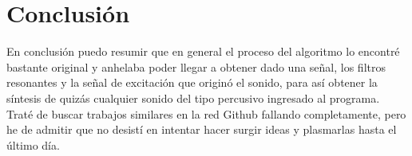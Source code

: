 \documentclass[11pt]{amsart}
\theoremstyle{plain}
\theoremstyle{definition}
\begin{document}
\section{Conclusión}
En conclusión puedo resumir que en general el proceso del algoritmo lo encontré bastante original y anhelaba poder llegar a obtener dado una señal, los filtros resonantes y la señal de excitación que originó el sonido, para así obtener la síntesis de quizás cualquier sonido del tipo percusivo ingresado al programa. Traté de buscar trabajos similares en la red Github fallando completamente, pero he de admitir que no desistí en intentar hacer surgir ideas y plasmarlas hasta el último día. 





\begin{footnotesize}


\end{footnotesize}
\end{document}
